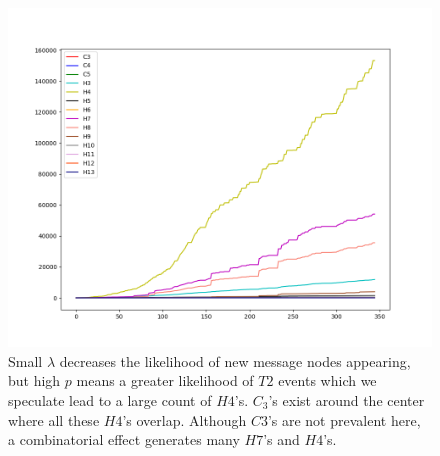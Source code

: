 \begin{figure}[h!]
    \includegraphics[width=16cm]{Images/twitter_sim_for_stats_3_0.2_0.8.png}
    \centering
    \caption{Small $\lambda$ decreases the likelihood of new message nodes appearing, but 
    high $p$ means a greater likelihood of $T2$ events which we speculate lead to a large
    count of $H4$'s. $C_3$'s exist around the center where all these $H4$'s
    overlap. Although $C3$'s are not prevalent here, a combinatorial effect generates 
    many $H7$'s and $H4$'s.}
    \label{fig:thij0208}
\end{figure}



